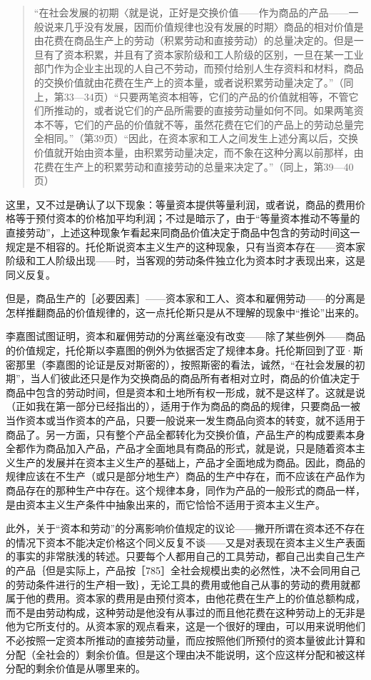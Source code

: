 \begin{quote}{“在社会发展的初期〈就是说，正好是交换价值——作为商品的产品——一般说来几乎没有发展，因而价值规律也没有发展的时期〉商品的相对价值是由花费在商品生产上的劳动（积累劳动和直接劳动）的总量决定的。但是一旦有了资本积累，并且有了资本家阶级和工人阶级的区别，一旦在某一工业部门作为企业主出现的人自己不劳动，而预付给别人生存资料和材料，商品的交换价值就由花费在生产上的资本量，或者说积累劳动量决定了。”（同上，第33—34页）“只要两笔资本相等，它们的产品的价值就相等，不管它们所推动的，或者说它们的产品所需要的直接劳动量如何不同。如果两笔资本不等，它们的产品的价值就不等，虽然花费在它们的产品上的劳动总量完全相同。”（第39页）“因此，在资本家和工人之间发生上述分离以后，交换价值就开始由资本量，由积累劳动量决定，而不象在这种分离以前那样，由花费在生产上的积累劳动和直接劳动的总量来决定了。”（同上，第39—40页）}\end{quote}

这里，又不过是确认了以下现象：等量资本提供等量利润，或者说，商品的费用价格等于预付资本的价格加平均利润；不过是暗示了，由于“等量资本推动不等量的直接劳动”，上述这种现象乍看起来同商品价值决定于商品中包含的劳动时间这一规定是不相容的。托伦斯说资本主义生产的这种现象，只有当资本存在——资本家阶级和工人阶级出现——时，当客观的劳动条件独立化为资本时才表现出来，这是同义反复。

但是，商品生产的［必要因素］——资本家和工人、资本和雇佣劳动——的分离是怎样推翻商品的价值规律的，这一点托伦斯只是从不理解的现象中“推论”出来的。

李嘉图试图证明，资本和雇佣劳动的分离丝毫没有改变——除了某些例外——商品的价值规定，托伦斯以李嘉图的例外为依据否定了规律本身。托伦斯回到了亚·斯密那里（李嘉图的论证是反对斯密的），按照斯密的看法，诚然，“在社会发展的初期”，当人们彼此还只是作为交换商品的商品所有者相对立时，商品的价值决定于商品中包含的劳动时间，但是资本和土地所有权一形成，就不是这样了。这就是说（正如我在第一部分已经指出的），适用于作为商品的商品的规律，只要商品一被当作资本或当作资本的产品，只要一般说来一发生商品向资本的转变，就不适用于商品了。另一方面，只有整个产品全都转化为交换价值，产品生产的构成要素本身全都作为商品加入产品，产品才全面地具有商品的形式，就是说，只是随着资本主义生产的发展并在资本主义生产的基础上，产品才全面地成为商品。因此，商品的规律应该在不生产（或只是部分地生产）商品的生产中存在，而不应该在产品作为商品存在的那种生产中存在。这个规律本身，同作为产品的一般形式的商品一样，是由资本主义生产条件中抽象出来的，而它恰恰不适用于资本主义生产。

此外，关于“资本和劳动”的分离影响价值规定的议论——撇开所谓在资本还不存在的情况下资本不能决定价格这个同义反复不谈——又是对表现在资本主义生产表面的事实的非常肤浅的转述。只要每个人都用自己的工具劳动，都自己出卖自己生产的产品｛但是实际上，产品按［785］全社会规模出卖的必然性，决不会同用自己的劳动条件进行的生产相一致｝，无论工具的费用或他自己从事的劳动的费用就都属于他的费用。资本家的费用是由预付资本，由他花费在生产上的价值总额构成，而不是由劳动构成，这种劳动是他没有从事过的而且他花费在这种劳动上的无非是他为它所支付的。从资本家的观点看来，这是一个很好的理由，可以用来说明他们不必按照一定资本所推动的直接劳动量，而应按照他们所预付的资本量彼此计算和分配（全社会的）剩余价值。但是这个理由决不能说明，这个应这样分配和被这样分配的剩余价值是从哪里来的。

